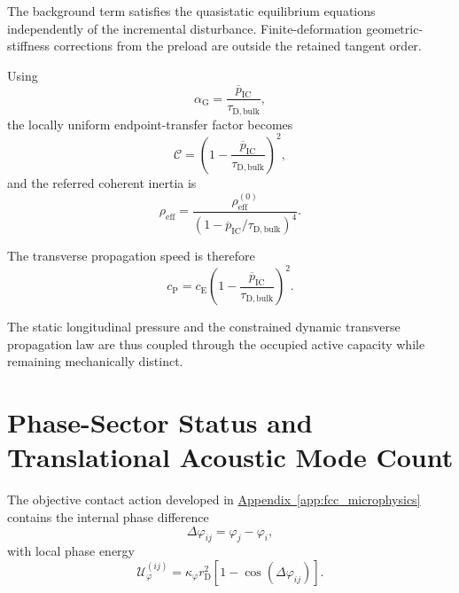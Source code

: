 The background term satisfies the quasistatic equilibrium equations independently of the incremental disturbance. Finite-deformation geometric-stiffness corrections from the preload are outside the retained tangent order.

Using
\begin{equation}
    \alpha_{\mathrm{G}}
    =
    \frac{\overline{p}_{\mathrm{IC}}}
    {\tau_{\mathrm{D,bulk}}},
\end{equation}
the locally uniform endpoint-transfer factor becomes
\begin{equation}
    \mathcal{C}
    =
    \left(
        1
        -
        \frac{\overline{p}_{\mathrm{IC}}}
        {\tau_{\mathrm{D,bulk}}}
    \right)^2,
\end{equation}
and the referred coherent inertia is
\begin{equation}
    \rho_{\mathrm{eff}}
    =
    \frac{
        \rho_{\mathrm{eff}}^{(0)}
    }{
        \left(
            1
            -
            \overline{p}_{\mathrm{IC}}
            /
            \tau_{\mathrm{D,bulk}}
        \right)^4
    }.
\end{equation}

The transverse propagation speed is therefore
\begin{equation}
    c_{\mathrm{P}}
    =
    c_{\mathrm{E}}
    \left(
        1
        -
        \frac{\overline{p}_{\mathrm{IC}}}
        {\tau_{\mathrm{D,bulk}}}
    \right)^2.
\end{equation}

The static longitudinal pressure and the constrained dynamic transverse propagation law are thus coupled through the occupied active capacity while remaining mechanically distinct.


\section{Phase-Sector Status and Translational Acoustic Mode Count}
\label{sec:AP_phase_status}

The objective contact action developed in \hyperref[app:fcc_microphysics]{Appendix~\ref*{app:fcc_microphysics}} contains the internal phase difference
\begin{equation}
    \Delta\varphi_{ij}
    =
    \varphi_j-\varphi_i,
\end{equation}
with local phase energy
\begin{equation}
    \mathcal{U}_{\varphi}^{(ij)}
    =
    \kappa_{\varphi}r_{\mathrm{D}}^2
    \left[
        1-\cos(\Delta\varphi_{ij})
    \right].
\end{equation}

